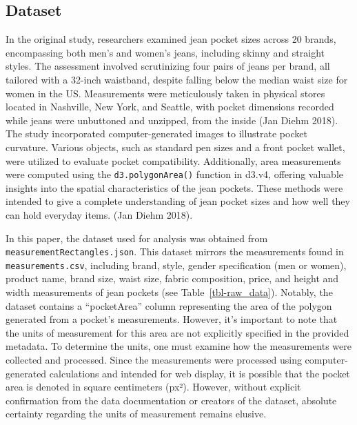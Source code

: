 \documentclass[
  letterpaper,
  DIV=11,
  numbers=noendperiod]{scrartcl}
\begin{document}
\hypertarget{dataset}{%
\subsection{Dataset}\label{dataset}}

In the original study, researchers examined jean pocket sizes across 20
brands, encompassing both men's and women's jeans, including skinny and
straight styles. The assessment involved scrutinizing four pairs of
jeans per brand, all tailored with a 32-inch waistband, despite falling
below the median waist size for women in the US. Measurements were
meticulously taken in physical stores located in Nashville, New York,
and Seattle, with pocket dimensions recorded while jeans were unbuttoned
and unzipped, from the inside (Jan Diehm 2018). The study incorporated
computer-generated images to illustrate pocket curvature. Various
objects, such as standard pen sizes and a front pocket wallet, were
utilized to evaluate pocket compatibility. Additionally, area
measurements were computed using the \texttt{d3.polygonArea()} function
in d3.v4, offering valuable insights into the spatial characteristics of
the jean pockets. These methods were intended to give a complete
understanding of jean pocket sizes and how well they can hold everyday
items. (Jan Diehm 2018).

In this paper, the dataset used for analysis was obtained from
\texttt{measurementRectangles.json}. This dataset mirrors the
measurements found in \texttt{measurements.csv}, including brand, style,
gender specification (men or women), product name, brand size, waist
size, fabric composition, price, and height and width measurements of
jean pockets (see Table~\ref{tbl-raw_data}). Notably, the dataset
contains a ``pocketArea'' column representing the area of the polygon
generated from a pocket's measurements. However, it's important to note
that the units of measurement for this area are not explicitly specified
in the provided metadata. To determine the units, one must examine how
the measurements were collected and processed. Since the measurements
were processed using computer-generated calculations and intended for
web display, it is possible that the pocket area is denoted in square
centimeters (px²). However, without explicit confirmation from the data
documentation or creators of the dataset, absolute certainty regarding
the units of measurement remains elusive. \newpage
\end{document}
